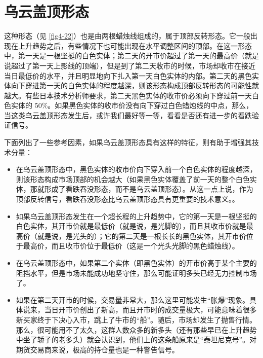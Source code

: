 \section{乌云盖顶形态\label{sec4-3}}
这种形态（见 \autoref{fig4-22}）也是由两根蜡烛线组成的，属于顶部反转形态。它一般出现在上升趋势之后，有些情况下也可能出现在水平调整区间的顶部。在这一形态中，第一天是一根坚挺的白色实体；第二天的开市价超过了第一天的最高价（就是说超过了第一天上影线的顶端），但是到了第二天收市的时候，市场却收市在接近当日最低价的水平，并且明显地向下扎入第一天白色实体的内部。第二天的黑色实体向下穿进第一天的白色实体的程度越深，则该形态构成顶部反转形态的可能性就越大。有些日本技术分析师要求，第二天黑色实体的收市价必须向下穿过前一天白色实体的 50\%。如果黑色实体的收市价没有向下穿过白色蜡烛线的中点，那么，当这类乌云盖顶形态发生后，或许我们最好等一等，看看是否还有进一步的看跌验证信号。


下面列出了一些参考因素，如果乌云盖顶形态具有这样的特征，则有助于增强其技术分量：
\begin{itemize}
    \item 在乌云盖顶形态中，黑色实体的收市价向下穿入前一个白色实体的程度越深，则该形态构成市场顶部的机会越大（如果黑色实体覆盖了前一天的整个白色实体，那就形成了看跌吞没形态，而不是乌云盖顶形态）。从这一点上说，作为顶部反转信号，看跌吞没形态比乌云盖顶形态具有更重要的技术意义。。
    \item 如果乌云盖顶形态发生在一个超长程的上升趋势中，它的第一天是一根坚挺的白色实体，其开市价就是最低价（就是说，是光脚的），而且其收市价就是最高价（就是说，是光头的）；它的第二天是一根长长的黑色实体，其开市价位于最高价，而且收市价位于最低价（这是一个光头光脚的黑色蜡烛线）。
    \item 在乌云盖顶形态中，如果第二个实体（即黑色实体）的开市价高于某个主要的阻挡水平，但是市场未能成功地坚守住，那么可能证明多头已经无力控制市场了。
    \item 如果在第二天开市的时候，交易量非常大，那么这里可能发生“胀爆”现象。具体说来，当日开市价创出了新高，而且开市时的成交量极大，可能意味着很多新买家终于下决心入市，跳上了牛市的“船”。随后，市场却发生了抛售行情。那么，很可能用不了太久，这群人数众多的新多头（还有那些早已在上升趋势中坐了轿子的老多头）就会认识到，他们上的这条船原来是“泰坦尼克号”。对期货交易商来说，极高的持仓量也是一种警告信号。
\end{itemize}

